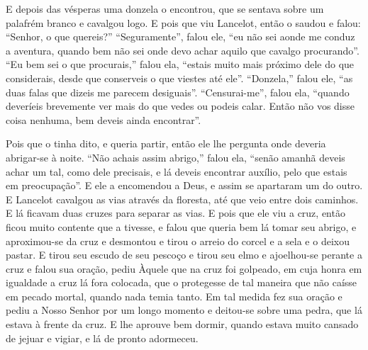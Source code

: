 E depois das vésperas uma donzela o encontrou, que se sentava sobre um
palafrém branco e cavalgou logo. E pois que viu Lancelot, então o saudou e
falou: “Senhor, o que quereis?” “Seguramente”, falou ele, “eu não sei aonde me
conduz a aventura, quando bem não sei onde devo achar aquilo que cavalgo
procurando”. “Eu bem sei o que procurais,” falou ela, “estais muito mais
próximo dele do que considerais, desde que conserveis o que viestes até ele”.
“Donzela,” falou ele, “as duas falas que dizeis me parecem desiguais”.
“Censurai-me”, falou ela, “quando deveríeis brevemente ver mais do que vedes ou
podeis calar. Então não vos disse coisa nenhuma, bem deveis ainda encontrar”.

Pois que o tinha dito, e queria partir, então ele lhe pergunta onde deveria
abrigar-se à noite. “Não achais assim abrigo,” falou ela, “senão amanhã deveis
achar um tal, como dele precisais, e lá deveis encontrar auxílio, pelo que
estais em preocupação”. E ele a encomendou a Deus, e assim se apartaram um do
outro. E Lancelot cavalgou as vias através da floresta, até que veio entre
dois caminhos. E lá ficavam duas cruzes para separar as vias. E pois que ele
viu a cruz, então ficou muito contente que a tivesse, e falou que queria bem lá
tomar seu abrigo, e aproximou-se da cruz e desmontou e tirou o arreio do corcel
e a sela e o deixou pastar. E tirou seu escudo de seu pescoço e tirou seu elmo
e ajoelhou-se perante a cruz e falou sua oração, pediu Àquele que na cruz foi
golpeado, em cuja honra em igualdade a cruz lá fora colocada, que o protegesse
de tal maneira que não caísse em pecado mortal, quando nada temia tanto. Em tal
medida fez sua oração e pediu a Nosso Senhor por um longo momento e deitou-se
sobre uma pedra, que lá estava à frente da cruz. E lhe aprouve bem dormir,
quando estava muito cansado de jejuar e vigiar, e lá de pronto adormeceu.


